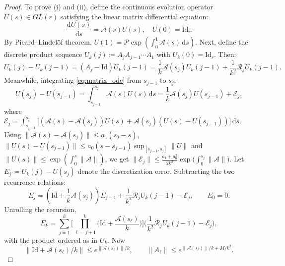 \documentclass[11pt,a4paper,reqno]{amsart}
\theoremstyle{definition}
\numberwithin{equation}{section}
\newcommand{\Id}{\mathrm{Id}}
\newcommand{\dif}{\,\mathrm{d}}
\begin{document}
\begin{proof}
To prove (i) and (ii), define the continuous evolution operator $U(s) \in GL(r)$ satisfying the linear matrix differential equation:
\begin{equation}
    \label{eq:matrix_ode}
    \frac{\dif U(s)}{\dif s} = \mathcal{A}(s) U(s), \quad U(0) = \Id_r.
\end{equation}
By Picard--Lindel\"of theorem, $U(1) = \mathcal{P} \exp(\int_0^1 \mathcal{A}(s) \dif s)$. Next, define the discrete product sequence $U_k(j) \coloneqq A_j A_{j-1} \cdots A_1$ with $U_k(0) = \Id_r$. Then:
\begin{equation}
    U_k(j) - U_k(j-1) = (A_j - \Id) U_k(j-1) = \frac{1}{k} \mathcal{A}(s_j) U_k(j-1) + \frac{1}{k^2} \mathcal{R}_j U_k(j-1).
\end{equation}
Meanwhile, integrating \eqref{eq:matrix_ode} from $s_{j-1}$ to $s_j$:
\begin{equation}
    U(s_j) - U(s_{j-1}) = \int_{s_{j-1}}^{s_j} \mathcal{A}(s) U(s) \dif s = \frac{1}{k} \mathcal{A}(s_j) U(s_{j-1}) + \mathcal{E}_j,
\end{equation}
where $\mathcal{E}_j = \int_{s_{j-1}}^{s_j} \big[(\mathcal{A}(s) - \mathcal{A}(s_j))U(s) + \mathcal{A}(s_j)(U(s) - U(s_{j-1}))\big] \dif s$. Using $\|\mathcal{A}(s) - \mathcal{A}(s_j)\| \le a_1 (s_j - s)$, $\|U(s) - U(s_{j-1})\| \le a_0 (s - s_{j-1}) \sup_{[s_{j-1}, s_j]}\|U\|$ and $\|U(s)\| \le \exp(\int_0^s \|\mathcal{A}\|)$, we get $\|\mathcal{E}_j\| \le \frac{a_1 + a_0^2}{2k^2} \exp\big(\int_0^{s_j} \|\mathcal{A}\|\big)$. Let $E_j \coloneqq U_k(j) - U(s_j)$ denote the discretization error. Subtracting the two recurrence relations:
\begin{equation}
    E_j = \left( \Id + \frac{1}{k} \mathcal{A}(s_j) \right) E_{j-1} + \frac{1}{k^2} \mathcal{R}_j U_k(j-1) - \mathcal{E}_j, \qquad E_0 = 0.
\end{equation}
Unrolling the recursion,
\begin{equation}
    E_k = \sum_{j=1}^k \Big[ \prod_{\ell=j+1}^{k} \Big(\Id + \frac{\mathcal{A}(s_\ell)}{k}\Big) \Big] \Big( \frac{1}{k^2} \mathcal{R}_j U_k(j-1) - \mathcal{E}_j \Big),
\end{equation}
with the product ordered as in $U_k$. Now
\[
\big\|\Id + \mathcal{A}(s_\ell)/k\big\| \le e^{\|\mathcal{A}(s_\ell)\|/k}, \qquad \|A_\ell\| \le e^{\|\mathcal{A}(s_\ell)\|/k + M/k^2}.
\]

\end{proof}
\end{document}
